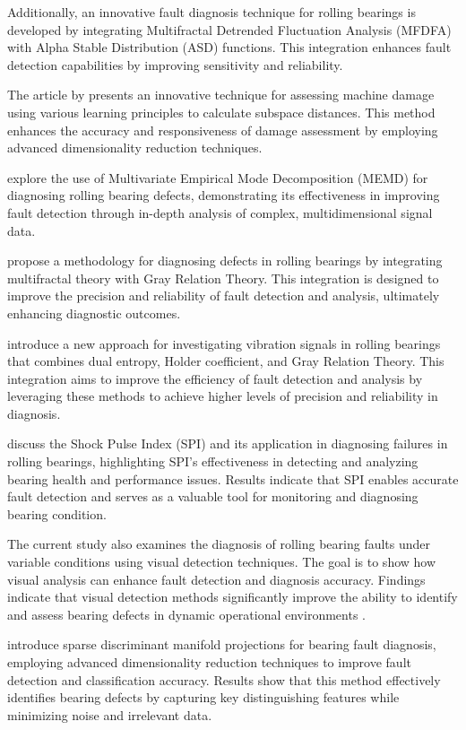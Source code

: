 \documentclass[sn-basic,pdflatex]{sn-jnl}
\theoremstyle{remark}
\theoremstyle{definition}
\begin{document}
Additionally, an innovative fault diagnosis technique for rolling
bearings is developed by integrating Multifractal Detrended Fluctuation
Analysis (MFDFA) with Alpha Stable Distribution (ASD) functions. This
integration enhances fault detection capabilities by improving
sensitivity and reliability.

The article by \citet{WOS:000366765500038} presents an innovative
technique for assessing machine damage using various learning principles
to calculate subspace distances. This method enhances the accuracy and
responsiveness of damage assessment by employing advanced dimensionality
reduction techniques.

\citet{WOS:000379556300014} explore the use of Multivariate Empirical
Mode Decomposition (MEMD) for diagnosing rolling bearing defects,
demonstrating its effectiveness in improving fault detection through
in-depth analysis of complex, multidimensional signal data.

\citet{WOS:000391229300006} propose a methodology for diagnosing defects
in rolling bearings by integrating multifractal theory with Gray
Relation Theory. This integration is designed to improve the precision
and reliability of fault detection and analysis, ultimately enhancing
diagnostic outcomes.

\citet{WOS:000426819400027} introduce a new approach for investigating
vibration signals in rolling bearings that combines dual entropy, Holder
coefficient, and Gray Relation Theory. This integration aims to improve
the efficiency of fault detection and analysis by leveraging these
methods to achieve higher levels of precision and reliability in
diagnosis.

\citet{WOS:000398818700108} discuss the Shock Pulse Index (SPI) and its
application in diagnosing failures in rolling bearings, highlighting
SPI's effectiveness in detecting and analyzing bearing health and
performance issues. Results indicate that SPI enables accurate fault
detection and serves as a valuable tool for monitoring and diagnosing
bearing condition.

The current study also examines the diagnosis of rolling bearing faults
under variable conditions using visual detection techniques. The goal is
to show how visual analysis can enhance fault detection and diagnosis
accuracy. Findings indicate that visual detection methods significantly
improve the ability to identify and assess bearing defects in dynamic
operational environments \citep{WOS:000404415000016}.

\citet{WOS:000401109400020} introduce sparse discriminant manifold
projections for bearing fault diagnosis, employing advanced
dimensionality reduction techniques to improve fault detection and
classification accuracy. Results show that this method effectively
identifies bearing defects by capturing key distinguishing features
while minimizing noise and irrelevant data.
\end{document}

